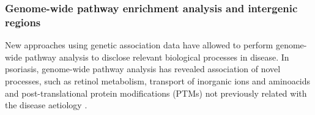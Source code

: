 
\subsubsection{Genome-wide pathway enrichment analysis and intergenic regions}

New approaches using genetic association data have allowed to perform genome-wide pathway analysis to disclose relevant biological processes in disease. %
In psoriasis, genome-wide pathway analysis has revealed association of novel processes, such as retinol metabolism, transport of inorganic ions and aminoacids and post-translational protein modifications (PTMs) not previously related with the disease aetiology \parencite{Aterido2015}. 

